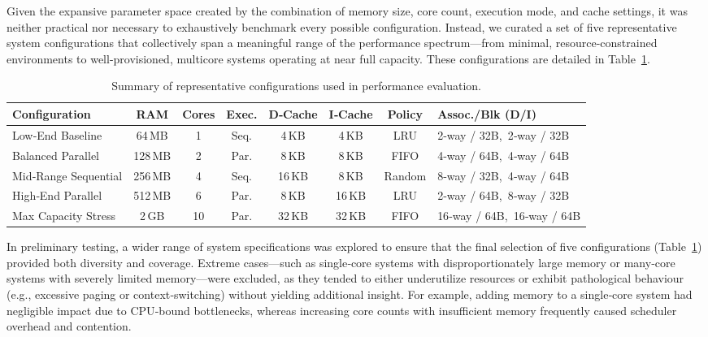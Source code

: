 Given the expansive parameter space created by the combination of memory size, core count, execution mode, and cache settings, it was neither practical nor necessary to exhaustively benchmark every possible configuration. Instead, we curated a set of five representative system configurations that collectively span a meaningful range of the performance spectrum—from minimal, resource-constrained environments to well-provisioned, multicore systems operating at near full capacity. These configurations are detailed in Table~\ref{tab:configurations}.

\begin{table}[h]
\centering
\footnotesize
\setlength{\tabcolsep}{5pt}
\renewcommand{\arraystretch}{1.2}
\begin{tabular}{|l|c|c|c|c|c|c|l|}
\hline
\textbf{Configuration} & \textbf{RAM} & \textbf{Cores} & \textbf{Exec.} &
\textbf{D‑Cache} & \textbf{I‑Cache} & \textbf{Policy} & \textbf{Assoc./Blk (D/I)} \\
\hline
Low‑End Baseline &
64\,MB & 1 & Seq. &
4\,KB & 4\,KB & LRU & 2‑way / 32B,\ 2‑way / 32B \\
\hline
Balanced Parallel &
128\,MB & 2 & Par. &
8\,KB & 8\,KB & FIFO & 4‑way / 64B,\ 4‑way / 64B \\
\hline
Mid‑Range Sequential &
256\,MB & 4 & Seq. &
16\,KB & 8\,KB & Random & 8‑way / 32B,\ 4‑way / 64B \\
\hline
High‑End Parallel &
512\,MB & 6 & Par. &
8\,KB & 16\,KB & LRU & 2‑way / 64B,\ 8‑way / 32B \\
\hline
Max Capacity Stress &
2\,GB & 10 & Par. &
32\,KB & 32\,KB & FIFO & 16‑way / 64B,\ 16‑way / 64B \\
\hline
\end{tabular}
\caption{Summary of representative configurations used in performance evaluation.}
\label{tab:configurations}
\end{table}

In preliminary testing, a wider range of system specifications was explored to ensure that the final selection of five configurations (Table~\ref{tab:configurations}) provided both diversity and coverage. Extreme cases—such as single‑core systems with disproportionately large memory or many‑core systems with severely limited memory—were excluded, as they tended to either underutilize resources or exhibit pathological behaviour (e.g., excessive paging or context‑switching) without yielding additional insight. For example, adding memory to a single‑core system had negligible impact due to CPU‑bound bottlenecks, whereas increasing core counts with insufficient memory frequently caused scheduler overhead and contention.

